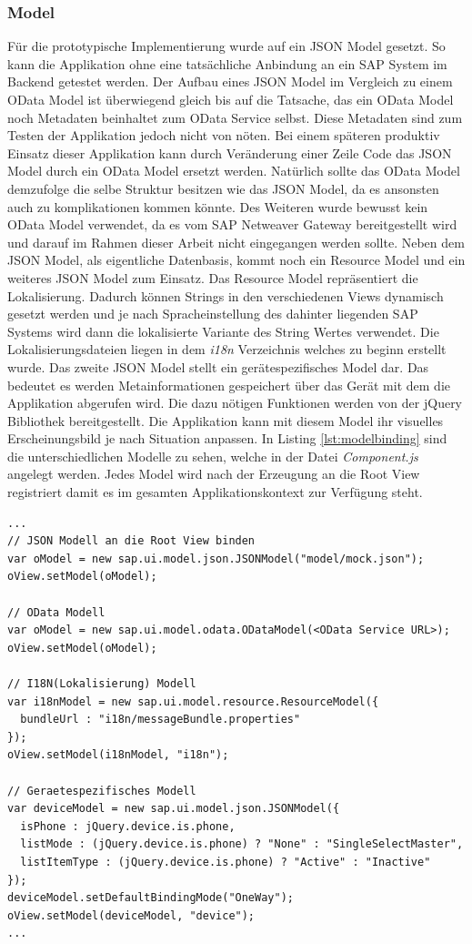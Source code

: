 \subsubsection{Model}
Für die prototypische Implementierung wurde auf ein JSON Model gesetzt. So kann die Applikation ohne eine tatsächliche Anbindung an ein SAP System im Backend getestet werden. Der Aufbau eines JSON Model im Vergleich zu einem OData Model ist überwiegend gleich bis auf die Tatsache, das ein OData Model noch Metadaten beinhaltet zum OData Service selbst. Diese Metadaten sind zum Testen der Applikation jedoch nicht von nöten. Bei einem späteren produktiv Einsatz dieser Applikation kann durch Veränderung einer Zeile Code das JSON Model durch ein OData Model ersetzt werden. Natürlich sollte das OData Model demzufolge die selbe Struktur besitzen wie das JSON Model, da es ansonsten auch zu komplikationen kommen könnte. Des Weiteren wurde bewusst kein OData Model verwendet, da es vom SAP Netweaver Gateway bereitgestellt wird und darauf im Rahmen dieser Arbeit nicht eingegangen werden sollte. Neben dem JSON Model, als eigentliche Datenbasis, kommt noch ein Resource Model und ein weiteres JSON Model zum Einsatz. Das Resource Model repräsentiert die Lokalisierung. Dadurch können Strings in den verschiedenen Views dynamisch gesetzt werden und je nach Spracheinstellung des dahinter liegenden SAP Systems wird dann die lokalisierte Variante des String Wertes verwendet. Die Lokalisierungsdateien liegen in dem \textit{i18n} Verzeichnis welches zu beginn erstellt wurde. Das zweite JSON Model stellt ein gerätespezifisches Model dar. Das bedeutet es werden Metainformationen gespeichert über das Gerät mit dem die Applikation abgerufen wird. Die dazu nötigen Funktionen werden von der jQuery Bibliothek bereitgestellt. Die Applikation kann mit diesem Model ihr visuelles Erscheinungsbild je nach Situation anpassen. In Listing \ref{lst:modelbinding} sind die unterschiedlichen Modelle zu sehen, welche in der Datei \textit{Component.js} angelegt werden. Jedes Model wird nach der Erzeugung an die Root View registriert damit es im gesamten Applikationskontext zur Verfügung steht.

\vspace{1em}
\begin{lstlisting}[frame=htrbl, caption=Model an die Root View binden, label=lst:modelbinding]
...
// JSON Modell an die Root View binden
var oModel = new sap.ui.model.json.JSONModel("model/mock.json");
oView.setModel(oModel);

// OData Modell
var oModel = new sap.ui.model.odata.ODataModel(<OData Service URL>);
oView.setModel(oModel);

// I18N(Lokalisierung) Modell
var i18nModel = new sap.ui.model.resource.ResourceModel({
  bundleUrl : "i18n/messageBundle.properties"
});
oView.setModel(i18nModel, "i18n");

// Geraetespezifisches Modell
var deviceModel = new sap.ui.model.json.JSONModel({
  isPhone : jQuery.device.is.phone,
  listMode : (jQuery.device.is.phone) ? "None" : "SingleSelectMaster",
  listItemType : (jQuery.device.is.phone) ? "Active" : "Inactive"
});
deviceModel.setDefaultBindingMode("OneWay");
oView.setModel(deviceModel, "device");
...
\end{lstlisting}

